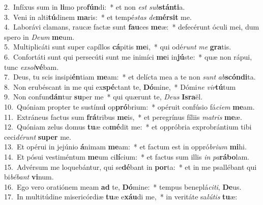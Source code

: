 {2.~}Infíxus sum in \textbf{li}mo pro\textbf{fún}di:~* et non \textit{est} \textit{sub}\textbf{stán}\textbf{ti}a.\\
{3.~}Veni in alti\textbf{tú}dinem \textbf{ma}ris:~* et tempé\textit{stas} \textit{de}\textbf{mér}\textbf{sit} me.\\
{4.~}Laborávi clamans, raucæ factæ sunt \textbf{fau}ces \textbf{me}æ:~* defecérunt óculi mei, dum spero in \textit{De}\textit{um} \textbf{me}um.\\
{5.~}Multiplicáti sunt super capíllos \textbf{cá}pitis \textbf{me}i,~* qui odé\textit{runt} \textit{me} \textbf{gra}tis.\\
{6.~}Confortáti sunt qui persecúti sunt me inimíci \textbf{me}i in\textbf{jú}ste:~* quæ non rápui, tunc \textit{ex}\textit{sol}\textbf{vé}bam.\\
{7.~}Deus, tu scis insipi\textbf{én}tiam \textbf{me}am:~* et delícta mea a te non \textit{sunt} \textit{ab}\textbf{scón}\textbf{di}ta.\\
{8.~}Non erubéscant in me qui ex\textbf{spé}ctant te, \textbf{Dó}mine,~* Dómi\textit{ne} \textit{vir}\textbf{tú}tum\\
{9.~}Non confun\textbf{dán}tur \textbf{su}per me~* qui quærunt te, \textit{De}\textit{us} \textbf{Is}\textbf{ra}ël.\\
{10.~}Quóniam propter te sustínu\textbf{i} op\textbf{pró}brium:~* opéruit confúsio fá\textit{ci}\textit{em} \textbf{me}am.\\
{11.~}Extráneus factus sum \textbf{frá}tribus \textbf{me}is,~* et peregrínus fíliis \textit{ma}\textit{tris} \textbf{me}æ.\\
{12.~}Quóniam zelus domus \textbf{tu}æ co\textbf{mé}dit me:~* et oppróbria exprobrántium tibi ceci\textit{dé}\textit{runt} \textbf{su}\textbf{per} me.\\
{13.~}Et opérui in jejúnio \textbf{á}nimam \textbf{me}am:~* et factum est in oppró\textit{bri}\textit{um} \textbf{mi}hi.\\
{14.~}Et pósui vestiméntum \textbf{me}um ci\textbf{lí}cium:~* et factus sum illis \textit{in} \textit{pa}\textbf{rá}\textbf{bo}lam.\\
{15.~}Advérsum me loquebántur, qui se\textbf{dé}bant in \textbf{por}ta:~* et in me psallébant qui bi\textit{bé}\textit{bant} \textbf{vi}num.\\
{16.~}Ego vero oratiónem meam \textbf{ad} te, \textbf{Dó}mine:~* tempus beneplá\textit{ci}\textit{ti}, \textbf{De}us.\\
{17.~}In multitúdine misericórdiæ \textbf{tu}æ e\textbf{xáu}di me,~* in veritáte sa\textit{lú}\textit{tis} \textbf{tu}æ:\\
